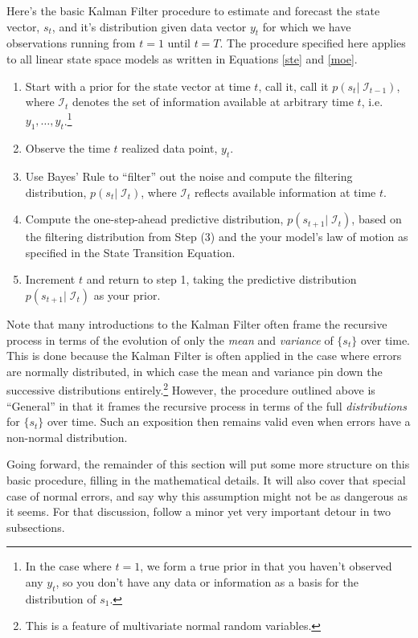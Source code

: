 \documentclass[a4paper,12pt]{article}
\begin{document}
Here's the basic Kalman Filter procedure to estimate and forecast the state vector, $s_t$, and it's distribution given data vector $y_t$ for which we have observations running from $t=1$ until $t=T$. The procedure specified here applies to all linear state space models as written in Equations \ref{ste} and \ref{moe}.
\begin{enumerate}
\item Start with a prior for the state vector at time $t$, call it, call it $p(s_t |\; \mathcal{I}_{t-1})$, where $\mathcal{I}_{t}$ denotes the set of information available at arbitrary time $t$, i.e. $y_1, \ldots, y_{t}$.\footnote{In the case where $t=1$, we form a true prior in that you haven't observed any $y_t$, so you don't have any data or information as a basis for the distribution of $s_1$.}
\item Observe the time $t$ realized data point, $y_t$. 
\item Use Bayes' Rule to ``filter'' out the noise and compute the filtering distribution, $p(s_t |\; \mathcal{I}_{t})$, where $\mathcal{I}_{t}$ reflects available information at time $t$.
\item Compute the one-step-ahead predictive distribution, $p(s_{t+1} | \; \mathcal{I}_{t})$, based on the filtering distribution from Step (3) and the your model's law of motion as specified in the State Transition Equation.  
\item Increment $t$ and return to step 1, taking
the predictive distribution $p(s_{t+1} |\; \mathcal{I}_{t})$ as your prior.
\end{enumerate} 
Note that many introductions to the Kalman Filter often frame the recursive process in terms of the evolution of only the \emph{mean} and \emph{variance} of $\{s_t\}$ over time. This is done because the Kalman Filter is often applied in the case where errors are normally distributed, in which case the mean and variance pin down the successive distributions {entirely}.\footnote{This is a feature of multivariate normal random variables.} However, the procedure outlined above is ``General'' in that it frames the recursive process in terms of the full \emph{distributions} for $\{s_t\}$ over time. Such an exposition then remains valid even when errors have a non-normal distribution.

Going forward, the remainder of this section will put some more structure on this basic procedure, filling in the mathematical details. It will also cover that special case of normal errors, and say why this assumption might not be as dangerous as it seems. For that discussion, follow a minor yet very important detour in two subsections.
\end{document}
